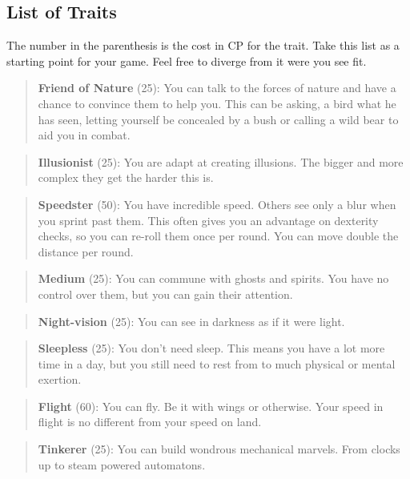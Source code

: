 \documentclass[11pt]{article}
\begin{document}
{\subsection{List of Traits}
\label{sec:org0bba13c}
The number in the parenthesis is the cost in CP for the trait. Take this list as a starting point for your game. Feel free to diverge from it were you see fit.

\begin{quote}
\textbf{Friend of Nature} (25): You can talk to the forces of nature and have a chance to convince them to help you. This can be asking, a bird what he has seen, letting yourself be concealed by a bush or calling a wild bear to aid you in combat.
\end{quote}

\begin{quote}
\textbf{Illusionist} (25): You are adapt at creating illusions. The bigger and more complex they get the harder this is.
\end{quote}

\begin{quote}
\textbf{Speedster} (50): You have incredible speed. Others see only a blur when you sprint past them. This often gives you an advantage on dexterity checks, so you can re-roll them once per round. You can move double the distance per round.
\end{quote}

\begin{quote}
\textbf{Medium} (25): You can commune with ghosts and spirits. You have no control over them, but you can gain their attention.
\end{quote}

\begin{quote}
\textbf{Night-vision} (25): You can see in darkness as if it were light.
\end{quote}

\begin{quote}
\textbf{Sleepless} (25): You don't need sleep. This means you have a lot more time in a day, but you still need to rest from to much physical or mental exertion.
\end{quote}

\begin{quote}
\textbf{Flight} (60): You can fly. Be it with wings or otherwise. Your speed in flight is no different from your speed on land.
\end{quote}

\begin{quote}
\textbf{Tinkerer} (25): You can build wondrous mechanical marvels. From clocks up to steam powered automatons. 
\end{quote}

}
\end{document}
